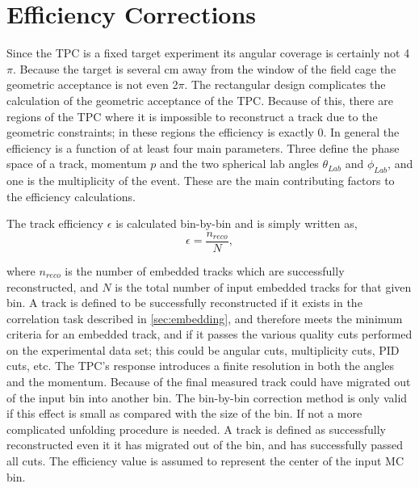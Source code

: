 



\section{Efficiency Corrections}
\label{sec:efficiency}

Since the \spirit TPC is a fixed target experiment its angular coverage is certainly not 4$\pi$. Because the target is several cm away from the window of the field cage the geometric acceptance is not even 2$\pi$. The rectangular design complicates the calculation of the geometric acceptance of the TPC. Because of this, there are regions of the TPC where it is impossible to reconstruct a track due to the geometric constraints; in these regions the efficiency is exactly 0. In general the efficiency is a function of at least four main parameters. Three define the phase space of a track, momentum $p$ and the two spherical lab angles $\theta_{Lab}$ and $\phi_{Lab}$, and one is the multiplicity of the event. These are the main contributing factors to the efficiency calculations. 

The track efficiency $\epsilon$ is calculated bin-by-bin and is simply written as, 
\begin{equation}
\epsilon = \frac{n_{reco}}{N},
\end{equation}

where $n_{reco}$ is the number of embedded tracks which are successfully reconstructed, and $N$ is the total number of input embedded tracks for that given bin. A track is defined to be successfully reconstructed if it exists in the correlation task described in \ref{sec:embedding}, and therefore meets the minimum criteria for an embedded track, and if it passes the various quality cuts performed on the experimental data set; this could be angular cuts, multiplicity cuts, PID cuts, etc. The TPC's response introduces a finite resolution in both the angles and the momentum. Because of the final measured track could have migrated out of the input bin into another bin. The bin-by-bin correction method is only valid if this effect is small as compared with the size of the bin. If not a more complicated unfolding procedure is needed. A track is defined as successfully reconstructed even it it has migrated out of the bin, and has successfully passed all cuts. The efficiency value is assumed to represent the center of the input MC bin.  

